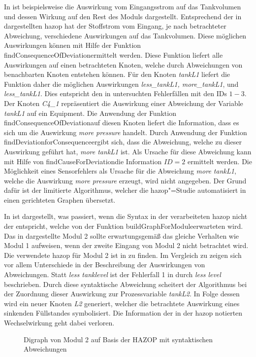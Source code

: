 In  ist beispielsweise die Auswirkung vom Eingangsstrom auf das Tankvolumen und dessen Wirkung auf den Rest des Moduls dargestellt. Entsprechend der in  dargestellten \ac{hazop} hat der Stoffstrom vom Eingang, je nach betrachteter Abweichung, verschiedene Auswirkungen auf das Tankvolumen. Diese m\"oglichen Auswirkungen k\"onnen mit Hilfe der Funktion \glqq findConsequenceOfDeviation\grqq { }ermittelt werden. Diese Funktion liefert alle Auswirkungen auf einen betrachteten Knoten, welche durch Abweichungen von benachbarten Knoten entstehen k\"onnen. F\"ur den Knoten \textit{tankL1} liefert die Funktion daher die m\"oglichen Auswirkungen \textit{less{\_}tankL1, more{\_}tankL1}, und \textit{less{\_}tankL1}. Dies entspricht den in  untersuchten Fehlerf\"allen mit den IDs $1-3$. \newline
Der Knoten \textit{C4{\_}1} repr\"asentiert die Auswirkung einer Abweichung der Variable \textit{tankL1} auf ein Equipment. Die Anwendung der Funktion \glqq findConsequenceOfDeviation\grqq { }auf diesen Knoten liefert die Information, dass es sich um die Auswirkung \textit{more pressure} handelt. Durch Anwendung der Funktion \glqq findDeviationforConsequence\grqq { }ergibt sich, dass die Abweichung, welche zu dieser Auswirkung gef\"uhrt hat, \textit{more tankL1} ist. Als Ursache f\"ur diese Abweichung kann mit Hilfe von \glqq findCauseForDeviation\grqq { }die Information \textit{$ID=2$} ermittelt werden. Die M\"oglichkeit eines Sensorfehlers als Ursache f\"ur die Abweichung \textit{more tankL1}, welche die Auswirkung \textit{more pressure} erzeugt, wird nicht angegeben. Der Grund daf\"ur ist der limitierte Algorithmus, welcher die \ac{hazop}"=Studie automatisiert in einen gerichteten Graphen \"ubersetzt. 

In  ist dargestellt, was passiert, wenn die Syntax in der verarbeiteten \ac{hazop} nicht der entspricht, welche von der Funktion \glqq buildGraphForModule\grqq { }erwarteten wird. Das in  dargestellte Modul 2 sollte erwartungsgem\"a\ss{} das gleiche Verhalten wie Modul 1 aufweisen, wenn der zweite Eingang von Modul 2 nicht betrachtet wird. Die verwendete \ac{hazop} f\"ur Modul 2 ist in  zu finden. Im Vergleich zu  zeigen sich vor allem Unterschiede in der Beschreibung der Auswirkungen von Abweichungen. Statt \textit{less tanklevel} ist der Fehlerfall 1 in  durch \textit{less level} beschrieben. Durch diese syntaktische Abweichung scheitert der Algorithmus bei der Zuordnung dieser Auswirkung zur Prozessvariable \textit{tankL2}. In Folge dessen wird ein neuer Knoten \textit{L2} generiert, welcher die betrachtete Auswirkung eines sinkenden F\"ullstandes symbolisiert. Die Information der in der \ac{hazop} notierten Wechselwirkung geht dabei verloren. 
\begin{figure}[h!tb]
\centering

\caption[fehlerhafter Digraph von Modul 2]{Digraph von Modul 2 auf Basis der HAZOP mit syntaktischen Abweichungen}
\label{fig:graph_mod2Error}
\end{figure}

